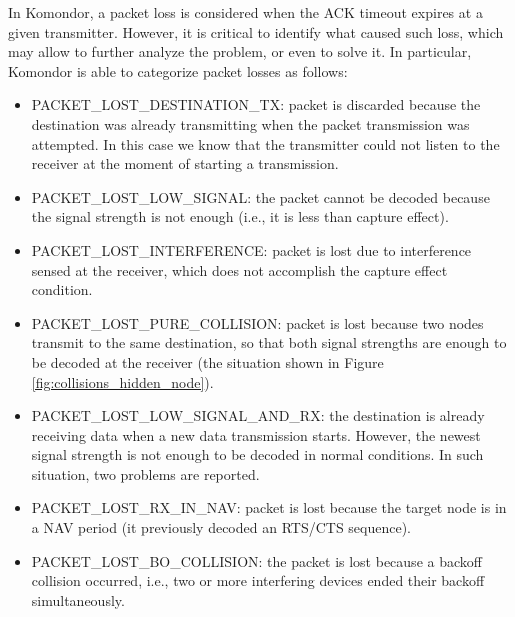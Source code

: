\documentclass[a4paper]{article}
\begin{document}
	In Komondor, a packet loss is considered when the ACK timeout expires at a given transmitter. However, it is critical to identify what caused such loss, which may allow to further analyze the problem, or even to solve it. In particular, Komondor is able to categorize packet losses as follows:
	\begin{itemize}
		\item PACKET\_LOST\_DESTINATION\_TX: packet is discarded because the destination was already transmitting when the packet transmission was attempted. In this case we know that the transmitter could not listen to the receiver at the moment of starting a transmission.
		\item PACKET\_LOST\_LOW\_SIGNAL: the packet cannot be decoded because the signal strength is not enough (i.e., it is less than capture effect).
		\item PACKET\_LOST\_INTERFERENCE: packet is lost due to interference sensed at the receiver, which does not accomplish the capture effect condition.	
		\item PACKET\_LOST\_PURE\_COLLISION: packet is lost because two nodes transmit to the same destination, so that both signal strengths are enough to be decoded  at the receiver (the situation shown in Figure \ref{fig:collisions_hidden_node}).
		\item PACKET\_LOST\_LOW\_SIGNAL\_AND\_RX: the destination is already receiving data when a new data transmission starts. However, the newest signal strength is not enough to be decoded in normal conditions. In such situation, two problems are reported. 
		\item PACKET\_LOST\_RX\_IN\_NAV: packet is lost because the target node is in a NAV period (it previously decoded an RTS/CTS sequence).		
		\item PACKET\_LOST\_BO\_COLLISION: the packet is lost because a backoff collision occurred, i.e., two or more interfering devices ended their backoff simultaneously.
	\end{itemize}	
	
\end{document}
